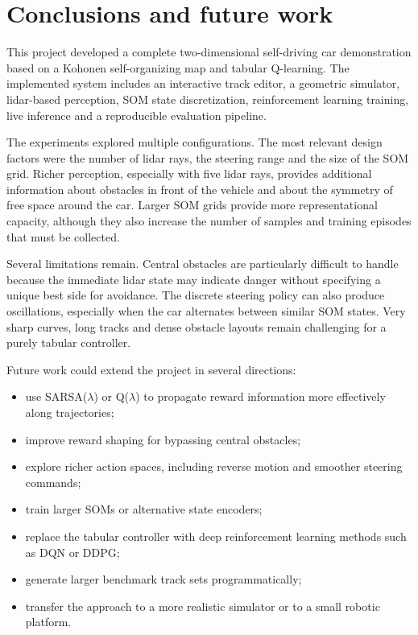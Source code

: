 \section{Conclusions and future work}
\label{ch:conclusions}

This project developed a complete two-dimensional self-driving car demonstration based on a Kohonen self-organizing map and tabular Q-learning. The implemented system includes an interactive track editor, a geometric simulator, lidar-based perception, SOM state discretization, reinforcement learning training, live inference and a reproducible evaluation pipeline.

The experiments explored multiple configurations. The most relevant design factors were the number of lidar rays, the steering range and the size of the SOM grid. Richer perception, especially with five lidar rays, provides additional information about obstacles in front of the vehicle and about the symmetry of free space around the car. Larger SOM grids provide more representational capacity, although they also increase the number of samples and training episodes that must be collected.

Several limitations remain. Central obstacles are particularly difficult to handle because the immediate lidar state may indicate danger without specifying a unique best side for avoidance. The discrete steering policy can also produce oscillations, especially when the car alternates between similar SOM states. Very sharp curves, long tracks and dense obstacle layouts remain challenging for a purely tabular controller.

Future work could extend the project in several directions:
\begin{itemize}
    \item use SARSA($\lambda$) or Q($\lambda$) to propagate reward information more effectively along trajectories;
    \item improve reward shaping for bypassing central obstacles;
    \item explore richer action spaces, including reverse motion and smoother steering commands;
    \item train larger SOMs or alternative state encoders;
    \item replace the tabular controller with deep reinforcement learning methods such as DQN or DDPG;
    \item generate larger benchmark track sets programmatically;
    \item transfer the approach to a more realistic simulator or to a small robotic platform.
\end{itemize}
